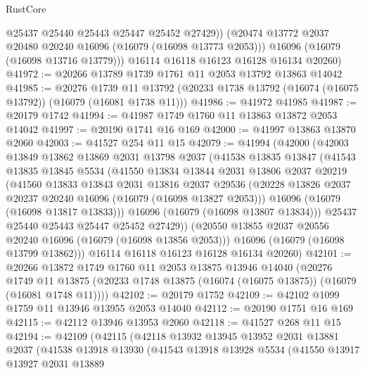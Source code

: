 \begin{lexlean}{RustCore}
\begin{coremodule}
            @25437
            @25440
            @25443
            @25447
            @25452
            @27429))
        (@20474 @13772 @2037 @20480 @20240 @16096 (@16079 (@16098 @13773 @2053)))
        @16096
        (@16079 (@16098 @13716 @13779)))
      @16114
      @16118
      @16123
      @16128
      @16134
      @20260)
@41972 := @20266 @13789 @1739 @1761 @11 @2053 @13792 @13863 @14042
@41985 := @20276
    @1739
    @11
    @13792
    (@20233 @1738 @13792 (@16074 (@16075 @13792)) (@16079 (@16081 @1738 @11)))
@41986 := @41972 @41985
@41987 := @20179 @1742
@41994 := @41987 @1749 @1760 @11 @13863 @13872 @2053 @14042
@41997 := @20190 @1741 @16 @169
@42000 := @41997 @13863 @13870 @2060
@42003 := @41527 @254 @11 @15
@42079 := @41994
    (@42000
      (@42003
        @13849
        @13862
        @13869
        @2031
        @13798
        @2037
        (@41538
          @13835
          @13847
          (@41543
            @13835
            @13845
            @5534
            (@41550
              @13834
              @13844
              @2031
              @13806
              @2037
              @20219
              (@41560
                @13833
                @13843
                @2031
                @13816
                @2037
                @29536
                (@20228 @13826 @2037 @20237 @20240 @16096 (@16079 (@16098 @13827 @2053)))
                @16096
                (@16079 (@16098 @13817 @13833)))
              @16096
              (@16079 (@16098 @13807 @13834)))
            @25437
            @25440
            @25443
            @25447
            @25452
            @27429))
        (@20550 @13855 @2037 @20556 @20240 @16096 (@16079 (@16098 @13856 @2053)))
        @16096
        (@16079 (@16098 @13799 @13862)))
      @16114
      @16118
      @16123
      @16128
      @16134
      @20260)
@42101 := @20266
    @13872
    @1749
    @1760
    @11
    @2053
    @13875
    @13946
    @14040
    (@20276
      @1749
      @11
      @13875
      (@20233 @1748 @13875 (@16074 (@16075 @13875)) (@16079 (@16081 @1748 @11))))
@42102 := @20179 @1752
@42109 := @42102 @1099 @1759 @11 @13946 @13955 @2053 @14040
@42112 := @20190 @1751 @16 @169
@42115 := @42112 @13946 @13953 @2060
@42118 := @41527 @268 @11 @15
@42194 := @42109
    (@42115
      (@42118
        @13932
        @13945
        @13952
        @2031
        @13881
        @2037
        (@41538
          @13918
          @13930
          (@41543
            @13918
            @13928
            @5534
            (@41550
              @13917
              @13927
              @2031
              @13889

\end{coremodule}
\end{lexlean}
